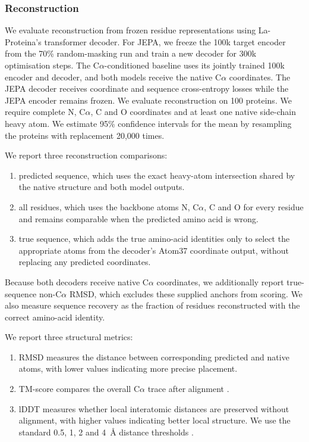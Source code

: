 \subsubsection{Reconstruction}
\label{sec:methods-reconstruction}

We evaluate reconstruction from frozen residue representations using La-Proteina's transformer decoder. For JEPA, we freeze the 100k target encoder from the 70\% random-masking run and train a new decoder for 300k optimisation steps. The C$\alpha$-conditioned baseline uses its jointly trained 100k encoder and decoder, and both models receive the native C$\alpha$ coordinates. The JEPA decoder receives coordinate and sequence cross-entropy losses while the JEPA encoder remains frozen. We evaluate reconstruction on 100 proteins. We require complete N, C$\alpha$, C and O coordinates and at least one native side-chain heavy atom. We estimate 95\% confidence intervals for the mean by resampling the proteins with replacement 20,000 times.

We report three reconstruction comparisons:
\begin{enumerate}[label=\arabic*.,leftmargin=2.5em,nosep]
    \item predicted sequence, which uses the exact heavy-atom intersection shared by the native structure and both model outputs.
    \item all residues, which uses the backbone atoms N, C$\alpha$, C and O for every residue and remains comparable when the predicted amino acid is wrong.
    \item true sequence, which adds the true amino-acid identities only to select the appropriate atoms from the decoder's Atom37 coordinate output, without replacing any predicted coordinates.
\end{enumerate}
Because both decoders receive native C$\alpha$ coordinates, we additionally report true-sequence non-C$\alpha$ RMSD, which excludes these supplied anchors from scoring. We also measure sequence recovery as the fraction of residues reconstructed with the correct amino-acid identity.

We report three structural metrics:
\begin{enumerate}[label=\arabic*.,leftmargin=2.5em,nosep]
    \item RMSD measures the distance between corresponding predicted and native atoms, with lower values indicating more precise placement.
    \item TM-score compares the overall C$\alpha$ trace after alignment \citep{zhang2004tmscore}.
    \item lDDT measures whether local interatomic distances are preserved without alignment, with higher values indicating better local structure. We use the standard 0.5, 1, 2 and 4~\AA{} distance thresholds \citep{mariani2013lddt}.
\end{enumerate}

